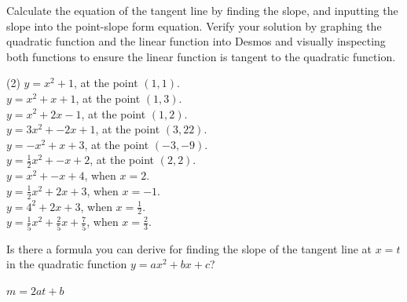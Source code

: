 \documentclass[12pt,fleqn]{book}
\newcommand{\prb}[1]{\begin{Exercise}#1\end{Exercise}}
\newcommand{\sol}[1]{\begin{Answer}#1\end{Answer}}
\begin{document}
\prb{Calculate the equation of the tangent line by finding the slope, and inputting the slope into the point-slope form equation.  Verify your solution by graphing the quadratic function and the linear function into Desmos and visually inspecting both functions to ensure the linear function is tangent to the quadratic function.
	\begin{tasks}(2)
		\task $y=x^2 + 1$, at the point $( 1, 1 )$.
		\\[10em]
		\task $y=x^2 + x + 1$, at the point $( 1, 3 )$.
		\\[10em]
		\task $y=x^2 + 2x -1$, at the point $( 1,  2)$.
		\\[10em]
		\task $y=3x^2 + -2x + 1$, at the point $( 3, 22 )$.
		\\[10em]
		\task $y=-x^2 + x + 3$, at the point $( -3, -9 )$.
		\\[10em]
		\task $y=\frac 12 x^2 + -x + 2$, at the point $( 2,  2)$.
		\\[10em]
		\task $y=x^2 + -x + 4$, when $x=2$.
		\\[10em]
		\task $y=\frac 12x^2 + 2x + 3$, when $x=-1$.
		\\[10em]
		\task $y=4^2 + 2x + 3$, when $x=\frac 12$.
		\\[10em]
		\task $y=\frac 15 x^2 + \frac 25x + \frac 75$, when $x=\frac 23$.
		\\[10em]
	\end{tasks}
}
\prb{Is there a formula you can derive for finding the slope of the tangent line at $x=t$ in the quadratic function $y=ax^2+bx+c$?}
\sol{$m=2at+b$}
\end{document}
